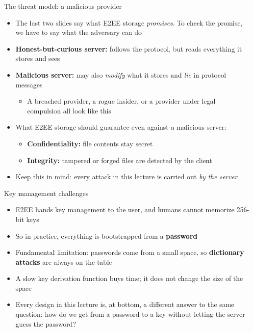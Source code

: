 \ifdefined\PRESENTATION\else\PassOptionsToClass{handout}{beamer}\fi\documentclass[aspectratio=169, lualatex]{beamer}
\begin{document}
\begin{frame}{The threat model: a malicious provider}
	\begin{itemize}
		\item The last two slides say what E2EE storage \textit{promises}. To check the promise, we have to say what the adversary can do
		\item \textbf{Honest-but-curious server:} follows the protocol, but reads everything it stores and sees
		\item \textbf{Malicious server:} may also \textit{modify} what it stores and \textit{lie} in protocol messages
		      \begin{itemize}
			      \item A breached provider, a rogue insider, or a provider under legal compulsion all look like this
		      \end{itemize}
		\item What E2EE storage should guarantee even against a malicious server:
		      \begin{itemize}
			      \item \textbf{Confidentiality:} file contents stay secret
			      \item \textbf{Integrity:} tampered or forged files are detected by the client
		      \end{itemize}
		\item Keep this in mind: every attack in this lecture is carried out \textit{by the server}
	\end{itemize}
\end{frame}

\begin{frame}{Key management challenges}
	\begin{itemize}
		\item E2EE hands key management to the user, and humans cannot memorize 256-bit keys
		\item So in practice, everything is bootstrapped from a \textbf{password}
		\item Fundamental limitation: passwords come from a small space, so \textbf{dictionary attacks} are always on the table
		\item A slow key derivation function buys time; it does not change the size of the space
		\item Every design in this lecture is, at bottom, a different answer to the same question: how do we get from a password to a key without letting the server guess the password?
	\end{itemize}
\end{frame}
\end{document}
